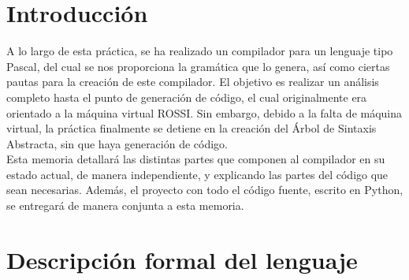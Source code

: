 \documentclass[11pt]{article}
\begin{document}
\setcounter{page}{0}
\tableofcontents
\newpage
\lstlistoflistings
\newpage



\renewcommand\tablename{Tabla}

\section{Introducción}
A lo largo de esta práctica, se ha realizado un compilador para un lenguaje tipo Pascal, del cual se nos proporciona la gramática que lo genera, así como ciertas pautas para la creación de este compilador. El objetivo es realizar un análisis completo hasta el punto de generación de código, el cual originalmente era orientado a la máquina virtual ROSSI. Sin embargo, debido a la falta de máquina virtual, la práctica finalmente se detiene en la creación del Árbol de Sintaxis Abstracta, sin que haya generación de código. \\

Esta memoria detallará las distintas partes que componen al compilador en su estado actual, de manera independiente, y explicando las partes del código que sean necesarias. Además, el proyecto con todo el código fuente, escrito en Python, se entregará de manera conjunta a esta memoria.

\section{Descripción formal del lenguaje}
\end{document}
